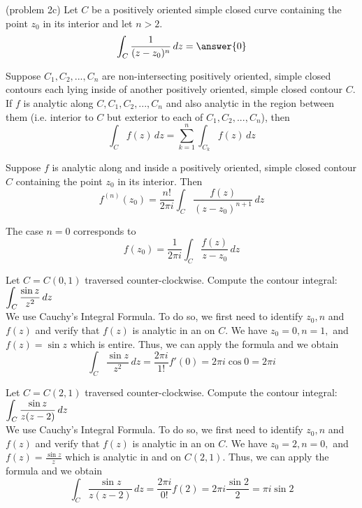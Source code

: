 \documentclass[handout]{ximera}
\begin{document}
\begin{problem}(problem 2c)
Let $C$ be a positively oriented simple closed curve containing the point $z_0$ in its interior and let $n > 2$.\\
\[
\int_C \frac{1}{(z-z_0)^n} \, dz = \answer{0}
\]
\end{problem}




\begin{theorem}
Suppose $C_1, C_2, ..., C_n$ are non-intersecting positively oriented, simple closed contours each lying inside of another positively oriented, simple closed contour $C$.  
If $f$ is analytic along $C, C_1, C_2, ..., C_n$ and also analytic in the region between them (i.e. interior to $C$ but exterior to each of $C_1, C_2, ..., C_n$), then
\[
\int_C f(z) \, dz = \sum_{k=1}^n \int_{C_k} f(z) \, dz
\]
\end{theorem}



\begin{theorem}
Suppose $f$ is analytic along and inside a positively oriented, simple closed contour $C$ containing the point $z_0$ in its interior.
Then
\[
f^{(n)}(z_0) = \frac{n!}{2\pi i} \int_C \frac{f(z)}{(z-z_0)^{n+1}} \, dz
\]
\end{theorem}

\begin{remark}
The case $n=0$ corresponds to 
\[
f(z_0) = \frac{1}{2\pi i} \int_C \frac{f(z)}{z-z_0} \, dz
\]
\end{remark}


\begin{example}[example 3a]
Let $C = C(0, 1)$ traversed counter-clockwise. Compute the contour integral: $\displaystyle \int_C \frac{\sin z}{z^2} \, dz$\\
We use Cauchy's Integral Formula.  To do so, we first need to identify $z_0, n$ and $f(z)$ and verify that $f(z)$ is analytic in an on $C$.
We have $z_0 = 0, n=1, $ and $f(z) = \sin z$ which is entire. Thus, we can apply the formula and we obtain
\[
\int_C \frac{\sin z}{z^2} \, dz = \frac{2\pi i}{1!} f'(0) = 2\pi i \cos 0  = 2 \pi i
\]
\end{example}

\begin{example}[example 3b]
Let $C = C(2, 1)$ traversed counter-clockwise. Compute the contour integral: $\displaystyle \int_C \frac{\sin z}{z(z-2)} \, dz$\\
We use Cauchy's Integral Formula.  To do so, we first need to identify $z_0, n$ and $f(z)$ and verify that $f(z)$ is analytic in an on $C$.
We have $z_0 = 2, n=0, $ and $f(z) = \frac{\sin z}{z}$ which is analytic in and on $C(2,1)$. Thus, we can apply the formula and we obtain
\[
\int_C \frac{\sin z}{z(z-2)} \, dz = \frac{2\pi i}{0!} f(2) = 2\pi i \frac{\sin 2}{2}  =  \pi i \sin 2
\]
\end{example}
\end{document}
